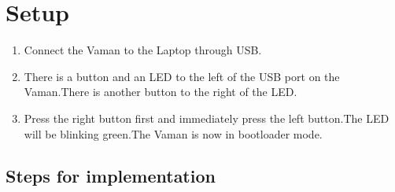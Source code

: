 \documentclass[10pt, a4paper]{article}
\begin{document}
\section{Setup}
\begin{enumerate}
\item Connect the Vaman to the Laptop through USB.
\item There is a button and an LED to the left of the USB port on the Vaman.There is another button to the right of the LED.
\item Press the right button first and immediately press the left button.The LED will be blinking green.The Vaman is now in bootloader mode.
\end{enumerate}
\vspace{5mm}
\subsection{Steps for implementation}
\end{document}
